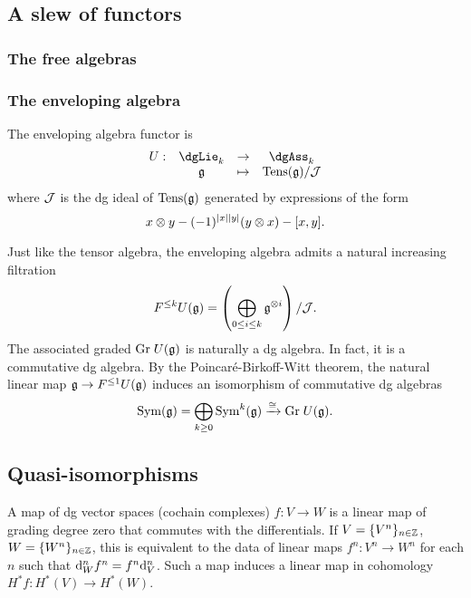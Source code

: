 \documentclass[11pt]{amsart}
\begin{document}
\subsection{A slew of functors}

\subsubsection{The free algebras}

\subsubsection{The enveloping algebra}

\def\Tens{{\rm Tens}}

\begin{dfn}
The enveloping algebra functor is
\[
\begin{array}{cccc}
U : & \dgLie_k & \to & \dgAss_k \\
& \fg & \mapsto & \Tens(\fg) / \cJ
\end{array}
\]
where $\mathcal J$ is the dg ideal of $\Tens(\fg)$ generated by expressions of the form 
\[
x \otimes y - (-1)^{|x||y|} (y \otimes x) - [x,y].
\]
\end{dfn}

\begin{rmk}
Just like the tensor algebra, the enveloping algebra admits a natural increasing filtration
\[
F^{\leq k} U(\mathfrak g) = \left(\bigoplus_{0 \leq i \leq k} \mathfrak g^{\otimes i}\right) / \mathcal J .
\]
The associated graded ${\rm Gr} \; U(\mathfrak g)$ is naturally a dg algebra. 
In fact, it is a commutative dg algebra. 
By the Poincar\'{e}-Birkoff-Witt theorem, the natural linear map $\mathfrak g \to F^{\leq 1}U(\mathfrak g)$ induces an isomorphism of commutative dg algebras
\[
{\rm Sym}(\mathfrak g) = \bigoplus_{k \geq 0} {\rm Sym}^k(\mathfrak g) \xrightarrow{\cong} {\rm Gr} \; U(\mathfrak g) . 
\] 
\end{rmk}

\subsection{Quasi-isomorphisms}

A map of dg vector spaces (cochain complexes) $f : V \to W$ is a linear map of grading degree zero that commutes with the differentials. 
If $V = \{V^n\}_{n \in \mathbb Z}$, $W = \{W^n\}_{n \in \mathbb Z}$,
this is equivalent to the data of linear maps $f^n : V^n \to W^n$ for each $n$ such that ${\rm d}^n_W f^n = f^n {\rm d}^n_V$. 
Such a map induces a linear map in cohomology $H^*f : H^*(V) \to H^*(W)$. 
\end{document}
